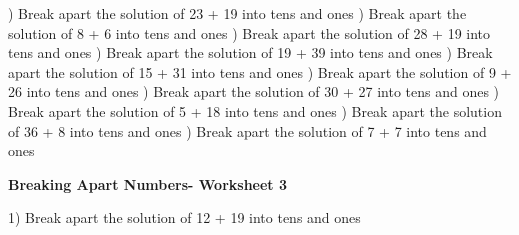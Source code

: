 \documentclass{article}%
\begin{document}
\newline%
\newline%
) Break apart the solution of 23 + 19 into tens and ones%
\newline%
\newline%
) Break apart the solution of 8 + 6 into tens and ones%
\newline%
\newline%
) Break apart the solution of 28 + 19 into tens and ones%
\newline%
\newline%
) Break apart the solution of 19 + 39 into tens and ones%
\newline%
\newline%
) Break apart the solution of 15 + 31 into tens and ones%
\newline%
\newline%
) Break apart the solution of 9 + 26 into tens and ones%
\newline%
\newline%
) Break apart the solution of 30 + 27 into tens and ones%
\newline%
\newline%
) Break apart the solution of 5 + 18 into tens and ones%
\newline%
\newline%
) Break apart the solution of 36 + 8 into tens and ones%
\newline%
\newline%
) Break apart the solution of 7 + 7 into tens and ones%
\newline%
\newline%
\newline%
\pagebreak%
\large%
\begin{center}%
\textbf{Breaking Apart Numbers- Worksheet 3}%
\newline%
\end{center} \normalsize%
1) Break apart the solution of 12 + 19 into tens and ones%
\newline%
\newline%
\end{document}
